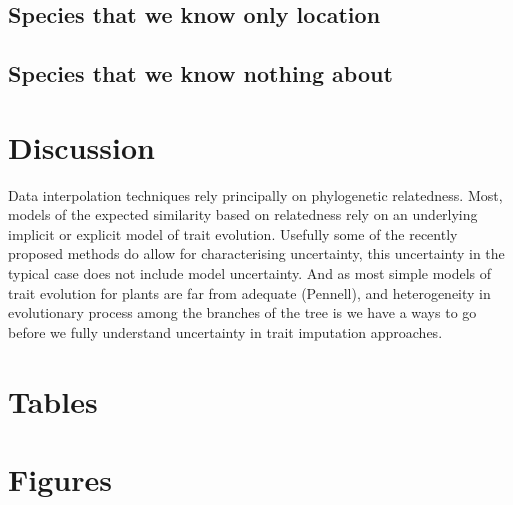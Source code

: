 \documentclass[a4paper,11pt]{article}
\begin{document}
\citep{hinchliff2014some}

\subsection{Species that we know only location}

\subsection{Species that we know nothing about}

\section{Discussion}




Data interpolation techniques rely principally on phylogenetic relatedness.  
Most, models of the expected similarity based on relatedness rely on an underlying implicit or explicit model of trait evolution.  
Usefully some of the recently proposed methods do allow for characterising uncertainty, this uncertainty in the typical case
does not include model uncertainty.  And as most simple models of trait evolution for plants are far from adequate (Pennell), and heterogeneity in evolutionary 
process among the branches of the tree is 
we have a ways to go before we fully understand uncertainty in trait imputation approaches.   

\section{Tables}









\section{Figures}
\end{document}
